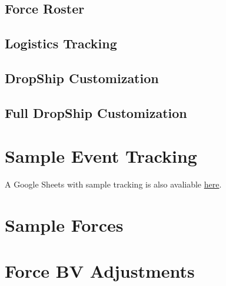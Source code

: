 \documentclass{article}
\newcommand{\mysectiontitle}{}
\newcommand{\newsection}[2]{\renewcommand{\mysectiontitle}{#2}\section{#1}}
\begin{document}
\subsection{Force Roster}



\subsection{Logistics Tracking}



\subsection{DropShip Customization}



\subsection{Full DropShip Customization}



\newpage

\newsection{Sample Event Tracking}{sample-tracking-event}
\label{sec:sample_tracking_event}

A Google Sheets with sample tracking is also avaliable \href{https://docs.google.com/spreadsheets/d/17bFS4qAbdIUJQ173NxxHDCCGLD_BG0LDdHGekpoF5M0/copy}{here}.



\newpage

\newsection{Sample Forces}{sample-forces}
\label{sec:sample_forces}



\newpage

\newsection{Force BV Adjustments}{bv-adjustments}
\label{sec:force_bv_adjustments}
\end{document}
